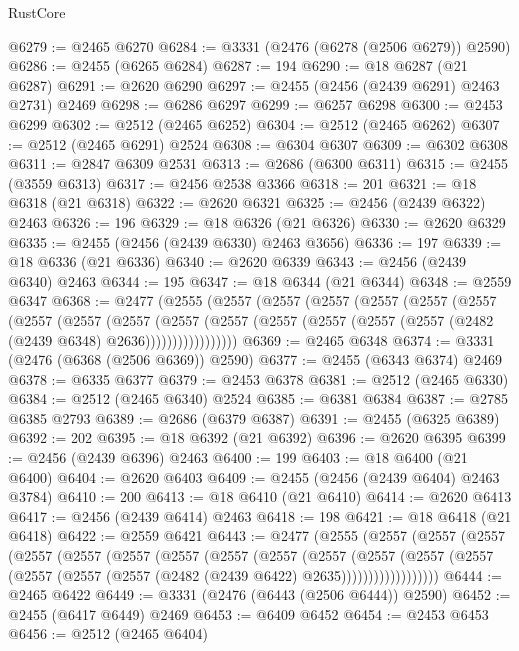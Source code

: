 \begin{lexlean}{RustCore}
\begin{coremodule}
@6279 := @2465 @6270
@6284 := @3331 (@2476 (@6278 (@2506 @6279)) @2590)
@6286 := @2455 (@6265 @6284)
@6287 := 194
@6290 := @18 @6287 (@21 @6287)
@6291 := @2620 @6290
@6297 := @2455 (@2456 (@2439 @6291) @2463 @2731) @2469
@6298 := @6286 @6297
@6299 := @6257 @6298
@6300 := @2453 @6299
@6302 := @2512 (@2465 @6252)
@6304 := @2512 (@2465 @6262)
@6307 := @2512 (@2465 @6291) @2524
@6308 := @6304 @6307
@6309 := @6302 @6308
@6311 := @2847 @6309 @2531
@6313 := @2686 (@6300 @6311)
@6315 := @2455 (@3559 @6313)
@6317 := @2456 @2538 @3366
@6318 := 201
@6321 := @18 @6318 (@21 @6318)
@6322 := @2620 @6321
@6325 := @2456 (@2439 @6322) @2463
@6326 := 196
@6329 := @18 @6326 (@21 @6326)
@6330 := @2620 @6329
@6335 := @2455 (@2456 (@2439 @6330) @2463 @3656)
@6336 := 197
@6339 := @18 @6336 (@21 @6336)
@6340 := @2620 @6339
@6343 := @2456 (@2439 @6340) @2463
@6344 := 195
@6347 := @18 @6344 (@21 @6344)
@6348 := @2559 @6347
@6368 := @2477
    (@2555
      (@2557
        (@2557
          (@2557
            (@2557
              (@2557
                (@2557
                  (@2557
                    (@2557
                      (@2557
                        (@2557
                          (@2557
                            (@2557 (@2557 (@2557 (@2557 (@2482 (@2439 @6348) @2636)))))))))))))))))
@6369 := @2465 @6348
@6374 := @3331 (@2476 (@6368 (@2506 @6369)) @2590)
@6377 := @2455 (@6343 @6374) @2469
@6378 := @6335 @6377
@6379 := @2453 @6378
@6381 := @2512 (@2465 @6330)
@6384 := @2512 (@2465 @6340) @2524
@6385 := @6381 @6384
@6387 := @2785 @6385 @2793
@6389 := @2686 (@6379 @6387)
@6391 := @2455 (@6325 @6389)
@6392 := 202
@6395 := @18 @6392 (@21 @6392)
@6396 := @2620 @6395
@6399 := @2456 (@2439 @6396) @2463
@6400 := 199
@6403 := @18 @6400 (@21 @6400)
@6404 := @2620 @6403
@6409 := @2455 (@2456 (@2439 @6404) @2463 @3784)
@6410 := 200
@6413 := @18 @6410 (@21 @6410)
@6414 := @2620 @6413
@6417 := @2456 (@2439 @6414) @2463
@6418 := 198
@6421 := @18 @6418 (@21 @6418)
@6422 := @2559 @6421
@6443 := @2477
    (@2555
      (@2557
        (@2557
          (@2557
            (@2557
              (@2557
                (@2557
                  (@2557
                    (@2557
                      (@2557
                        (@2557
                          (@2557
                            (@2557
                              (@2557
                                (@2557 (@2557 (@2557 (@2482 (@2439 @6422) @2635))))))))))))))))))
@6444 := @2465 @6422
@6449 := @3331 (@2476 (@6443 (@2506 @6444)) @2590)
@6452 := @2455 (@6417 @6449) @2469
@6453 := @6409 @6452
@6454 := @2453 @6453
@6456 := @2512 (@2465 @6404)

\end{coremodule}
\end{lexlean}
